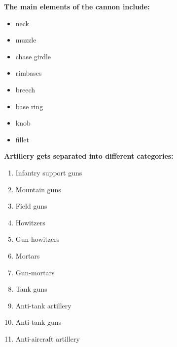 \textbf{The main elements of the cannon include:}
\begin{itemize}
    \item neck
    \item muzzle
    \item chase girdle
    \item rimbases
    \item breech
    \item base ring
    \item knob
    \item fillet
\end{itemize}

\textbf{Artillery gets separated into different categories:}\par
\begin{enumerate}
    \item Infantry support guns
    \item Mountain guns
    \item Field guns
    \item Howitzers
    \item Gun-howitzers
    \item Mortars
    \item Gun-mortars
    \item Tank guns
    \item Anti-tank artillery
    \item Anti-tank guns
    \item Anti-aircraft artillery
\end{enumerate}

